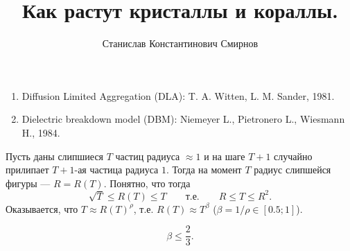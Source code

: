 \documentclass[12pt,a4paper]{article}
\title{Как растут кристаллы и кораллы.}
\author{Станислав Константинович Смирнов}
\begin{document}
    \maketitle

    \begin{enumerate}
        \item Diffusion Limited Aggregation (DLA): T. A. Witten, L. M. Sander, 1981.
        \item Dielectric breakdown model (DBM): Niemeyer L., Pietronero L., Wiesmann H., 1984.
    \end{enumerate}

    Пусть даны слипшиеся $T$ частиц радиуса $\approx 1$ и на шаге $T+1$ случайно прилипает $T+1$-ая частица радиуса $1$. Тогда на момент $T$ радиус слипшейся фигуры --- $R = R(T)$. Понятно, что тогда
    \[\sqrt{T} \leqslant R(T) \leqslant T \qquad \text{т.е.} \qquad R \leqslant T \leqslant R^2.\]
    Оказывается, что $T \approx R(T)^\rho$, т.е. $R(T) \approx T^\beta$ ($\beta = 1/\rho \in [0.5; 1]$).

    \begin{theorem}
        \[\beta \leqslant \frac{2}{3}.\]
    \end{theorem}

    
\end{document}
